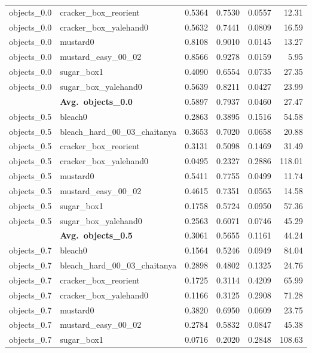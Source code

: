 \begin{longtable}{llrrrr}
  objects_0.0 & cracker\_box\_reorient & 0.5364 & 0.7530 & 0.0557 & 12.31 \\
  objects_0.0 & cracker\_box\_yalehand0 & 0.5632 & 0.7441 & 0.0809 & 16.59 \\
  objects_0.0 & mustard0 & 0.8108 & 0.9010 & 0.0145 & 13.27 \\
  objects_0.0 & mustard\_easy\_00\_02 & 0.8566 & 0.9278 & 0.0159 & 5.95 \\
  objects_0.0 & sugar\_box1 & 0.4090 & 0.6554 & 0.0735 & 27.35 \\
  objects_0.0 & sugar\_box\_yalehand0 & 0.5639 & 0.8211 & 0.0427 & 23.99 \\
  \cmidrule{2-6}
  & \textbf{Avg.~objects_0.0} & 0.5897 & 0.7937 & 0.0460 & 27.47 \\
  \midrule
  objects_0.5 & bleach0 & 0.2863 & 0.3895 & 0.1516 & 54.58 \\
  objects_0.5 & bleach\_hard\_00\_03\_chaitanya & 0.3653 & 0.7020 & 0.0658 & 20.88 \\
  objects_0.5 & cracker\_box\_reorient & 0.3131 & 0.5098 & 0.1469 & 31.49 \\
  objects_0.5 & cracker\_box\_yalehand0 & 0.0495 & 0.2327 & 0.2886 & 118.01 \\
  objects_0.5 & mustard0 & 0.5411 & 0.7755 & 0.0499 & 11.74 \\
  objects_0.5 & mustard\_easy\_00\_02 & 0.4615 & 0.7351 & 0.0565 & 14.58 \\
  objects_0.5 & sugar\_box1 & 0.1758 & 0.5724 & 0.0950 & 57.36 \\
  objects_0.5 & sugar\_box\_yalehand0 & 0.2563 & 0.6071 & 0.0746 & 45.29 \\
  \cmidrule{2-6}
  & \textbf{Avg.~objects_0.5} & 0.3061 & 0.5655 & 0.1161 & 44.24 \\
  \midrule
  objects_0.7 & bleach0 & 0.1564 & 0.5246 & 0.0949 & 84.04 \\
  objects_0.7 & bleach\_hard\_00\_03\_chaitanya & 0.2898 & 0.4802 & 0.1325 & 24.76 \\
  objects_0.7 & cracker\_box\_reorient & 0.1725 & 0.3114 & 0.4209 & 65.99 \\
  objects_0.7 & cracker\_box\_yalehand0 & 0.1166 & 0.3125 & 0.2908 & 71.28 \\
  objects_0.7 & mustard0 & 0.3820 & 0.6950 & 0.0609 & 23.75 \\
  objects_0.7 & mustard\_easy\_00\_02 & 0.2784 & 0.5832 & 0.0847 & 45.38 \\
  objects_0.7 & sugar\_box1 & 0.0716 & 0.2020 & 0.2848 & 108.63 \\

\end{longtable}
